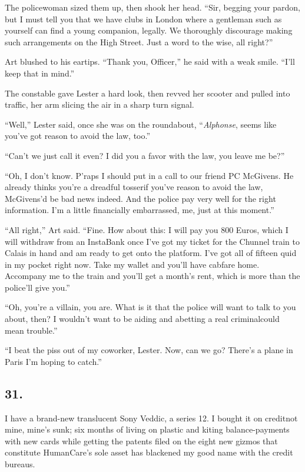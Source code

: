 The policewoman sized them up, then shook her head. “Sir, begging
your pardon, but I must tell you that we have clubs in London where
a gentleman such as yourself can find a young companion, legally.
We thoroughly discourage making such arrangements on the High
Street. Just a word to the wise, all right?”

Art blushed to his eartips. “Thank you, Officer,” he said with a
weak smile. “I’ll keep that in mind.”

The constable gave Lester a hard look, then revved her scooter and
pulled into traffic, her arm slicing the air in a sharp turn
signal.

“Well,” Lester said, once she was on the roundabout,
“\emph{Alphonse}, seems like you’ve got reason to avoid the law,
too.”

“Can’t we just call it even? I did you a favor with the law, you
leave me be?”

“Oh, I don’t know. P’raps I should put in a call to our friend PC
McGivens. He already thinks you’re a dreadful tosser{\dash}if you’ve
reason to avoid the law, McGivens’d be bad news indeed. And the
police pay very well for the right information. I’m a little
financially embarrassed, me, just at this moment.”

“All right,” Art said. “Fine. How about this: I will pay you 800
Euros, which I will withdraw from an InstaBank once I’ve got my
ticket for the Chunnel train to Calais in hand and am ready to get
onto the platform. I’ve got all of fifteen quid in my pocket right
now. Take my wallet and you’ll have cabfare home. Accompany me to
the train and you’ll get a month’s rent, which is more than the
police’ll give you.”

“Oh, you’re a villain, you are. What is it that the police will
want to talk to you about, then? I wouldn’t want to be aiding and
abetting a real criminal{\dash}could mean trouble.”

“I beat the piss out of my coworker, Lester. Now, can we go?
There’s a plane in Paris I’m hoping to catch.”

\subsection{31.}

I have a brand-new translucent Sony Veddic, a series 12. I bought
it on credit{\dash}not mine, mine’s sunk; six months of living on plastic
and kiting balance-payments with new cards while getting the
patents filed on the eight new gizmos that constitute HumanCare’s
sole asset has blackened my good name with the credit bureaus.

